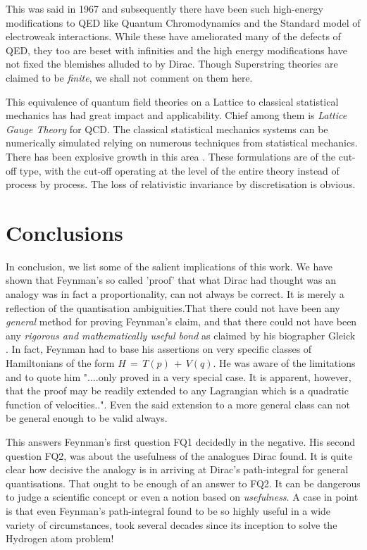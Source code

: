 \documentclass[a4paper]{JHEP3}
\begin{document}
This was said in 1967 and subsequently there have been such high-energy modifications to QED like Quantum Chromodynamics and the Standard
model of electroweak interactions. While these have ameliorated many of the defects of QED, they too are beset with infinities and the
high energy modifications have not fixed the blemishes alluded to by Dirac. Though Superstring theories are claimed to be {\it finite}, we
shall not comment on them here.

This equivalence of quantum field theories on a Lattice to classical statistical mechanics has had great impact and applicability. Chief 
among them is
{\it Lattice Gauge Theory} \cite{seiler} for QCD. The classical statistical mechanics systems can be numerically simulated relying on numerous techniques
from statistical mechanics. There has been explosive growth in this area \cite{creutz}. These formulations are of the cut-off type, with
the cut-off operating at the level of the entire theory instead of process by process. The loss of relativistic invariance by discretisation
is obvious.
\section{Conclusions}
In conclusion, we list some of the salient implications of this work.  We have shown that Feynman's  so called 'proof' that what Dirac had
thought was an analogy was in fact a proportionality, can not always be correct. It is merely a reflection of the quantisation ambiguities.That 
there could not have been any {\it general} method for proving Feynman's claim, and that there could not have been any {\it rigorous 
and mathematically useful bond} as claimed by his biographer Gleick \cite{gleick}.
In fact, Feynman had to base his assertions on very specific classes of Hamiltonians of the form $H\,=\,T(p)\,+\,V(q)$. He was aware of the
limitations and to quote him "....only proved in a very special case. It is apparent, however, that the proof may be readily extended to
any Lagrangian which is a quadratic function of velocities..". Even the said extension to a more general class can not be general enough to
be valid always.

This answers Feynman's first question FQ1 decidedly in the negative. His second question FQ2, was about the usefulness
of the analogues Dirac found. It is quite clear how decisive the analogy is in arriving at Dirac's path-integral for general quantisations.
That ought to be enough of an answer to FQ2. It can be dangerous to judge a scientific concept or even a notion
based on {\it usefulness}. A case in point is that even Feynman's path-integral found to be so highly useful in a wide variety of circumstances,
took several decades since its inception to solve the Hydrogen atom problem! 
\end{document}
